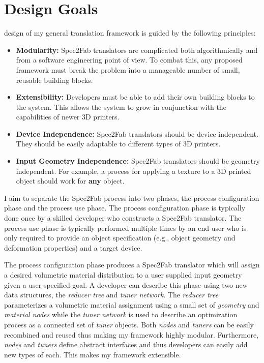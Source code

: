 \chapter{Design Goals}
\label{chap:design}
 design of my general translation framework is guided by the following principles:

\begin{itemize}

\item \textbf{Modularity:} Spec2Fab translators are complicated both algorithmically and from a software engineering point of view. To combat this, any proposed framework must break the problem into a manageable number of small, reusable building blocks. 

\item \textbf{Extensibility:} Developers must be able to add their own building blocks to the system. This allows the system to grow in conjunction with the capabilities of newer 3D printers.
\vspace{-0.25\baselineskip}

\item \textbf{Device Independence:} Spec2Fab translators should be device independent. They should be easily adaptable to different types of 3D printers.
\item \textbf{Input Geometry Independence:} Spec2Fab translators should be geometry independent. For example, a process for applying a texture to a 3D printed object should work for \textbf{any} object.
\vspace{-0.25\baselineskip}
\end{itemize}

I aim to separate the Spec2Fab process into two phases, the process configuration phase and the process use phase. The process configuration phase is typically done once by a skilled developer who  constructs a Spec2Fab translator. The process use phase is typically performed multiple times by an end-user who is only required to provide an object specification (e.g., object geometry and deformation properties) and a target device. 

	The process configuration phase produces a Spec2Fab translator which will assign a desired volumetric material distribution to a user supplied input geometry given a user specified goal. A developer can describe this phase using two new data structures, the \emph{reducer tree} and \emph{tuner network}. The \emph{reducer tree} parameterizes a volumetric material assignment using a small set of \emph{geometry} and \emph{material nodes} while the \emph{tuner network} is used to describe an optimization process as a connected set of \emph{tuner} objects.  Both \emph{nodes} and \emph{tuners} can be easily recombined and reused thus making my framework highly modular. Furthermore,  \emph{nodes} and \emph{tuners} define abstract interfaces and thus developers can easily add new types of each. This makes my framework extensible.
	
